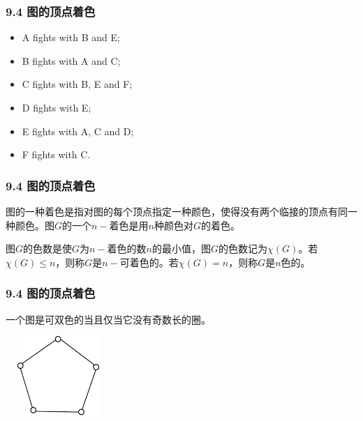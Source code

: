 \documentclass{beamer}
\begin{document}
\begin{CJK}{UTF8}{gbsn}
\begin{frame}
  \frametitle{9.4 图的顶点着色}
  \begin{itemize}
  \item A fights with B and E;
  \item B fights with A and C;
  \item C fights with B, E and F;
  \item D fights with E;
  \item E fights with A, C and D;
    \item F fights with C.
  \end{itemize}
\end{frame}
\begin{frame}
  \frametitle{9.4 图的顶点着色}
  \begin{definition9.4.1}
    图的一种\alert{着色}是指对图的每个顶点指定一种颜色，使得没有两个临接的顶点有同一种颜色。图$G$的一个\alert{$n-$着色}是用$n$种颜色对$G$的着色。
  \end{definition9.4.1}
  \begin{definition9.4.2}
    图$G$的\alert{色数}是使$G$为$n-$着色的数$n$的最小值，图$G$的色数记为$\chi(G)$。若$\chi (G) \leq n$，则称$G$是\alert{$n-$可着色}的。若$\chi (G) = n$，则称$G$是\alert{$n$色}的。
  \end{definition9.4.2}
\end{frame}
\begin{frame}
  \frametitle{9.4 图的顶点着色}
  \begin{theorem9.4.1}
    一个图是可双色的当且仅当它没有奇数长的圈。
  \end{theorem9.4.1}
\vspace{1cm}
  \begin{minipage}{0.45\linewidth}
\includegraphics[width=4cm,height=3cm]{pentagon}    
  \end{minipage}
  \begin{minipage}{0.45\linewidth}
   
  \end{minipage}
\end{frame}


\end{CJK}
\end{document}
